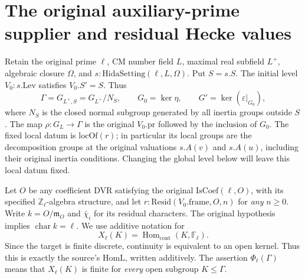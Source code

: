 \section{The original auxiliary-prime supplier and residual Hecke values}
\label{sec:count-auxiliary-primes}


Retain the original prime $\ell$, CM number field $L$, maximal real
subfield $L^+$, algebraic closure $\Omega$, and
$s:\mathrm{HidaSetting}(\ell,L,\Omega)$.  Put $S=s.S$.  The initial
level $V_0:s.\mathrm{Lev}$ satisfies $V_0.S'=S$.  Thus
\[
 \Gamma=G_{L^+,S}
  =G_{L^+}/N_S,\qquad G_0=\ker\eta,\qquad
 G'=\ker(\varepsilon|_{G_0}),
 \tag{CAP.1}
\]
where $N_S$ is the closed normal subgroup generated by all inertia
groups outside $S$.  The map $\rho:G_L\to\Gamma$ is the original
$V_0.\mathrm{pr}$ followed by the inclusion of $G_0$.
The fixed local datum is $\mathrm{locOf}(r)$; in particular its local
groups are the decomposition groups at the original valuations
$s.A(v)$ and $s.A(u)$, including their original inertia conditions.
Changing the global level below will leave this local datum fixed.

Let $O$ be any coefficient DVR satisfying the original
$\mathrm{IsCoef}(\ell,O)$, with its specified $\mathbb Z_\ell$-algebra
structure, and let $r:\mathrm{Resid}(V_0.\mathrm{frame},O,n)$ for
\emph{any} $n\geq0$.  Write $k=O/\mathfrak m_O$ and $\bar\chi_i$
for its residual characters.  The original hypothesis implies
$\operatorname{char}k=\ell$.  We use additive notation for
\[
 X_\ell(K)=\operatorname{Hom}_{\mathrm{cont}}(K,\mathbb F_\ell).
 \tag{CAP.2}
\]
Since the target is finite discrete, continuity is equivalent to an
open kernel.  Thus this is exactly the source's $\mathrm{HomL}$,
written additively.  The assertion $\Phi_\ell(\Gamma)$ means that
$X_\ell(K)$ is finite for \emph{every} open subgroup $K\leq\Gamma$.

